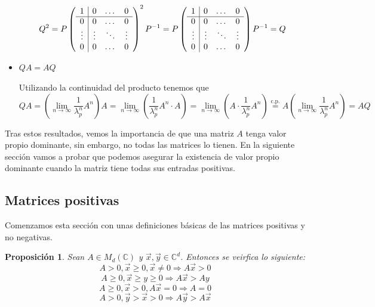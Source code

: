 \documentclass[size=a4, parskip=half, titlepage=false, toc=flat, toc=bib, 12pt]{scrartcl}
\makeatletter
\renewenvironment{proof}[1][\proofname] {\par\pushQED{\qed}\normalfont\topsep6\p@\@plus6\p@\relax\trivlist\item[\hskip\labelsep\itshape\tgpaella#1\@addpunct{.}]\ignorespaces}{\popQED\endtrivlist\@endpefalse}
\theoremstyle{theorem-style}
\newtheorem{nprop}{Proposición}[section]
\theoremstyle{definition-style}
\theoremstyle{remark-style}
\theoremstyle{example-style}
\theoremstyle{definition-style}
\theoremstyle{remark-style}
\makeatother
\begin{document}
\begin{proof}
\begin{itemize}
$$Q^2 = P \left(
      \begin{array}{{c|ccc}}
            1         &    0      &   \dots    & 0\\\hline
            0         &    0       &    \dots    & 0 \\
            \vdots    &    \vdots  &  \ddots &  \vdots \\
           0          &     0       &    \dots    & 0
      \end{array}   \right)^2 P^{-1} = P \left(
            \begin{array}{{c|ccc}}
                  1         &    0      &   \dots    & 0\\\hline
                  0         &    0       &    \dots    & 0 \\
                  \vdots    &    \vdots  &  \ddots &  \vdots \\
                 0          &     0       &    \dots    & 0
            \end{array}   \right) P^{-1} = Q $$
\item $QA = AQ$

Utilizando la continuidad del producto tenemos que
$$QA = (\lim_{n \to \infty} \frac{1}{\lambda_p^n} A^n)A = \lim_{n \to \infty} (\frac{1}{\lambda_p^n} A^n \cdot A) = \lim_{n \to \infty} (A \cdot \frac{1}{\lambda_p^n} A^n) \overset{\textrm{c.p.}} = A ( \lim_{n \to \infty} \frac{1}{\lambda_p^n} A^n) = AQ$$

\end{itemize}
\end{proof}

Tras estos resultados, vemos la importancia de que una matriz $A$ tenga valor propio dominante, sin embargo, no todas las matrices lo tienen. En la siguiente sección vamos a probar que podemos asegurar la existencia de valor propio dominante cuando la matriz tiene todas sus entradas positivas.

\subsection{Matrices positivas}

Comenzamos esta sección con unas definiciones básicas de las matrices positivas y no negativas.

\begin{nprop}
Sean $A \in M_d(\mathbb{C})$ y $\vec{x},\vec{y} \in \mathbb{C}^d$. Entonces se veirfica lo siguiente:
\begin{equation}\label{eq1} A > 0, \vec{x} \geq 0, \vec{x} \neq 0 \Rightarrow A \vec{x} > 0 \end{equation}
\begin{equation} A \geq 0, \vec{x} \geq y \geq 0 \Rightarrow A \vec{x} > Ay \end{equation}
\begin{equation} A \geq 0, \vec{x} > 0, A \vec{x} = 0 \Rightarrow A = 0 \end{equation}
\begin{equation} \label{eq4} A > 0, \vec{y} > \vec{x} > 0 \Rightarrow A\vec{y} > A\vec{x} \end{equation}
\end{nprop}
\end{document}
